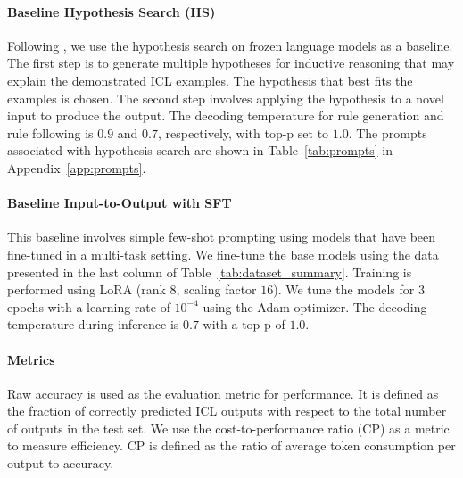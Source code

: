 \paragraph{Baseline Hypothesis Search (HS)} Following \citet{wang2023hypothesis}, we use the hypothesis search on frozen language models as a baseline. The first step is to generate multiple hypotheses for inductive reasoning that may explain the demonstrated ICL examples. The hypothesis that best fits the examples is chosen. The second step involves applying the hypothesis to a novel input to produce the output. The decoding temperature for rule generation and rule following is $0.9$ and $0.7$, respectively, with top-p set to $1.0$. The prompts associated with hypothesis search are shown in Table~\ref{tab:prompts} in Appendix~\ref{app:prompts}. 

\paragraph{Baseline Input-to-Output with SFT} This baseline involves simple few-shot prompting using models that have been fine-tuned in a multi-task setting. We fine-tune the base models using the data presented in the last column of Table~\ref{tab:dataset_summary}. Training is performed using LoRA (rank $8$, scaling factor $16$). We tune the models for 3 epochs with a learning rate of $10^{-4}$ using the Adam optimizer. The decoding temperature during inference is $0.7$ with a top-p of $1.0$. 

\paragraph{Metrics} 
Raw accuracy is used as the evaluation metric for performance. It is defined as the fraction of correctly predicted ICL outputs with respect to the total number of outputs in the test set. We use the cost-to-performance ratio (CP) as a metric to measure efficiency. CP is defined as the ratio of average token consumption per output to accuracy.



